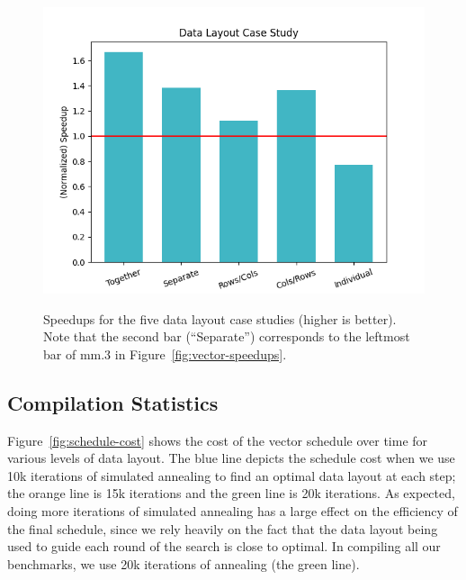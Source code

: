\begin{figure}
    \includegraphics[width=0.7\linewidth]{figures/graphs/case_study.png}
    \caption{Speedups for the five data layout case studies (higher is better). Note that the second bar (``Separate'') corresponds to the leftmost bar of {\sf mm.3} in Figure~\ref{fig:vector-speedups}.}
    \label{fig:data-layout-case-study}
\end{figure}


\subsection{Compilation Statistics}
Figure~\ref{fig:schedule-cost} shows the cost of the vector schedule over time for various levels of data layout.
The blue line depicts the schedule cost when we use 10k iterations of simulated annealing to find an optimal data layout at each step; the orange line is 15k iterations and the green line is 20k iterations.
As expected, doing more iterations of simulated annealing has a large effect on the efficiency of the final schedule, since we rely heavily on the fact that the data layout being used to guide each round of the search is close to optimal.
In compiling all our benchmarks, we use 20k iterations of annealing (the green line).

